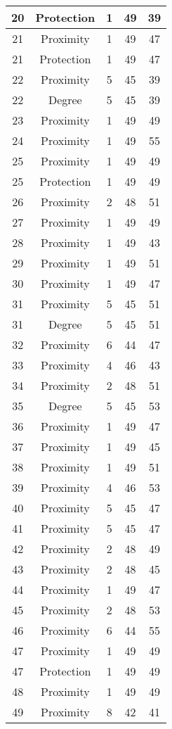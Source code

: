 \documentclass[results.tex]{subfiles}
\begin{document}
\begin{center}
\begin{tabular}{| c || c | c | c | c |}
    \hline
    20 & Protection & 1 & 49 & 39 \\ 
    \hline
    21 & Proximity & 1 & 49 & 47 \\ 
    \hline
    21 & Protection & 1 & 49 & 47 \\ 
    \hline
    22 & Proximity & 5 & 45 & 39 \\ 
    \hline
    22 & Degree & 5 & 45 & 39 \\ 
    \hline
    23 & Proximity & 1 & 49 & 49 \\ 
    \hline
    24 & Proximity & 1 & 49 & 55 \\ 
    \hline
    25 & Proximity & 1 & 49 & 49 \\ 
    \hline
    25 & Protection & 1 & 49 & 49 \\ 
    \hline
    26 & Proximity & 2 & 48 & 51 \\ 
    \hline
    27 & Proximity & 1 & 49 & 49 \\ 
    \hline
    28 & Proximity & 1 & 49 & 43 \\ 
    \hline
    29 & Proximity & 1 & 49 & 51 \\ 
    \hline
    30 & Proximity & 1 & 49 & 47 \\ 
    \hline
    31 & Proximity & 5 & 45 & 51 \\ 
    \hline
    31 & Degree & 5 & 45 & 51 \\ 
    \hline
    32 & Proximity & 6 & 44 & 47 \\ 
    \hline
    33 & Proximity & 4 & 46 & 43 \\ 
    \hline
    34 & Proximity & 2 & 48 & 51 \\ 
    \hline
    35 & Degree & 5 & 45 & 53 \\ 
    \hline
    36 & Proximity & 1 & 49 & 47 \\ 
    \hline
    37 & Proximity & 1 & 49 & 45 \\ 
    \hline
    38 & Proximity & 1 & 49 & 51 \\ 
    \hline
    39 & Proximity & 4 & 46 & 53 \\ 
    \hline
    40 & Proximity & 5 & 45 & 47 \\ 
    \hline
    41 & Proximity & 5 & 45 & 47 \\ 
    \hline
    42 & Proximity & 2 & 48 & 49 \\ 
    \hline
    43 & Proximity & 2 & 48 & 45 \\ 
    \hline
    44 & Proximity & 1 & 49 & 47 \\ 
    \hline
    45 & Proximity & 2 & 48 & 53 \\ 
    \hline
    46 & Proximity & 6 & 44 & 55 \\ 
    \hline
    47 & Proximity & 1 & 49 & 49 \\ 
    \hline
    47 & Protection & 1 & 49 & 49 \\ 
    \hline
    48 & Proximity & 1 & 49 & 49 \\ 
    \hline
    49 & Proximity & 8 & 42 & 41 \\ 
    \hline   \end{tabular}
\end{center}
\end{document}
